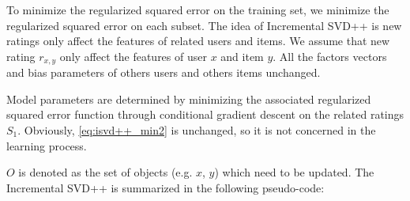 \documentclass[oneside,13pt]{extreport}
\begin{document}
To minimize the regularized squared error on the training set, we minimize the regularized squared error on each subset. The idea of Incremental SVD++ is new ratings only affect the features of related users and items. We assume that new rating $r_{x,y}$ only affect the features of user $x$ and item $y$. All the factors vectors and bias parameters of others users and others items unchanged.  

Model parameters are determined by minimizing the associated regularized squared error function through conditional gradient descent on the related ratings $S_1$. Obviously, \ref{eq:isvd++_min2} is unchanged, so it is not concerned in the learning process. 

$O$ is denoted as the set of objects (e.g. $x$, $y$) which need to be updated. The Incremental SVD++ is summarized in the following pseudo-code:
\\\\
\end{document}
